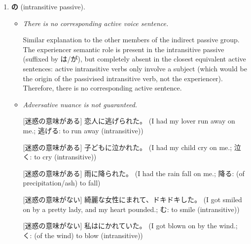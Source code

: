 \documentclass[../nihongo-gakushuu-kyouzai.tex]{subfiles}
\begin{document}
\begin{enumerate}[label=\arabic*.]
\begin{itemize}
        [直接受身、自然] 私のパソコンが田中さんにされた。 (My computer was broken by Tanaka-san.)

        \item When the passive sentence involves parties related to the owner, the direct passive is also possible.

        [自動詞の受身、自然] （私は）先生に息子をけなされた。 (I got my child disparaged on me by his teacher.; けなす: to speak ill of/disparage (transitive))

        [直接受身、自然] 私の息子は先生にけなされた。 (My child was disparaged by his teacher.)

    \end{itemize}

    \item \textbf{の} (intransitive passive).


    \begin{itemize}
        \item \emph{There is no corresponding active voice sentence.}

        Similar explanation to the other members of the indirect passive group. The experiencer semantic role is present in the intransitive passive (suffixed by は/が), but completely absent in the closest equivalent active sentences: active intransitive verbs only involve a subject (which would be the origin of the passivised intransitive verb, not the experiencer). Therefore, there is no corresponding active sentence.

        \item \emph{Adversative nuance is not guaranteed.}

        [迷惑の意味がある] 恋人に逃げられた。 (I had my lover run away on me.; 逃げる: to run away (intransitive))

        [迷惑の意味がある] 子どもに泣かれた。 (I had my child cry on me.; 泣く: to cry (intransitive))

        [迷惑の意味がある] 雨に降られた。 (I had the rain fall on me.; 降る: (of precipitation/ash) to fall)

        [迷惑の意味がない] 綺麗な女性にまれて、ドキドキした。 (I got smiled on by a pretty lady, and my heart pounded.; む: to smile (intransitive))

        [迷惑の意味がない] 私はにかれていた。 (I got blown on by the wind.; く: (of the wind) to blow (intransitive))


\end{itemize}
\end{enumerate}
\end{document}
